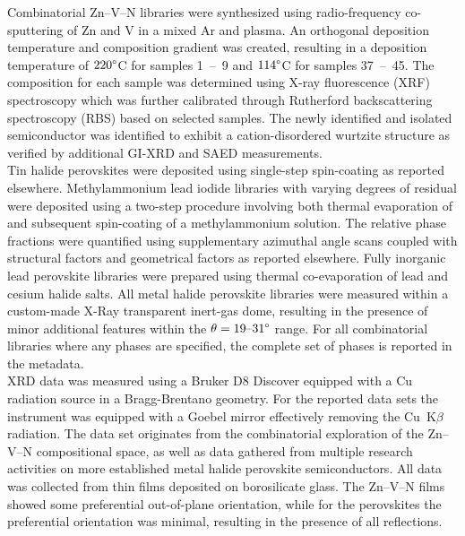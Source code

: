 Combinatorial Zn–V–N libraries were synthesized using radio-frequency co-sputtering of Zn and V in a mixed Ar and  plasma. An orthogonal deposition temperature and composition gradient was created, resulting in a deposition temperature of $220\degree$C for samples 1~–~9 and $114\degree$C for samples 37~–~45. The composition for each sample was determined using X-ray fluorescence (XRF) spectroscopy which was further calibrated through Rutherford backscattering spectroscopy (RBS) based on selected samples. The newly identified and isolated semiconductor  was identified to exhibit a cation-disordered wurtzite structure as verified by additional GI-XRD and SAED measurements\cite{Zhuk2021}. \\
Tin halide perovskites were deposited using single-step spin-coating as reported elsewhere\cite{Wieczorek2023}. Methylammonium lead iodide libraries with varying degrees of residual  were deposited using a two-step procedure involving both thermal evaporation of  and subsequent spin-coating of a methylammonium solution. The relative phase fractions were quantified using supplementary azimuthal angle scans coupled with structural factors and geometrical factors as reported elsewhere\cite{Wieczorek2024}. Fully inorganic lead perovskite libraries were prepared using thermal co-evaporation of lead and cesium halide salts. All metal halide perovskite libraries were measured within a custom-made X-Ray transparent inert-gas dome, resulting in the presence of minor additional features within the $\theta=19 \text{–}31\degree$ range. For all combinatorial libraries where any phases are specified, the complete set of phases is reported in the metadata. \\

XRD data was measured using a Bruker D8 Discover equipped with a Cu radiation source in a Bragg-Brentano geometry. For the reported data sets the instrument was equipped with a Goebel mirror effectively removing the Cu~K$\beta$ radiation. The data set originates from the combinatorial exploration of the Zn–V–N compositional space, as well as data gathered from multiple research activities on more established metal halide perovskite semiconductors. All data was collected from thin films deposited on borosilicate glass. The Zn–V–N films showed some preferential out-of-plane orientation, while for the perovskites the preferential orientation was minimal, resulting in the presence of all reflections. \\

